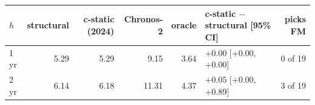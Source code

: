 \begin{tabular}{lrrrrlr}
\toprule
$h$ & structural & c-static (2024) & Chronos-2 & oracle & c-static $-$ structural [95\% CI] & picks FM \\
\midrule
1\,yr & 5.29 & 5.29 & 9.15 & 3.64 & $+0.00$ [+0.00, +0.00] & 0 of 19 \\
2\,yr & 6.14 & 6.18 & 11.31 & 4.37 & $+0.05$ [+0.00, +0.89] & 3 of 19 \\
\bottomrule
\end{tabular}

